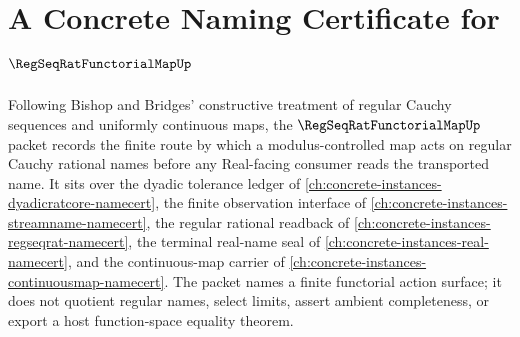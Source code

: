 \chapter{A Concrete Naming Certificate for $\RegSeqRatFunctorialMapUp$}
\label{ch:concrete-instances-regseqrat-functorial-map-namecert}

Following Bishop and Bridges' constructive treatment of regular Cauchy sequences and uniformly continuous maps, the $\RegSeqRatFunctorialMapUp$ packet records the finite route by which a modulus-controlled map acts on regular Cauchy rational names before any Real-facing consumer reads the transported name. It sits over the dyadic tolerance ledger of \autoref{ch:concrete-instances-dyadicratcore-namecert}, the finite observation interface of \autoref{ch:concrete-instances-streamname-namecert}, the regular rational readback of \autoref{ch:concrete-instances-regseqrat-namecert}, the terminal real-name seal of \autoref{ch:concrete-instances-real-namecert}, and the continuous-map carrier of \autoref{ch:concrete-instances-continuousmap-namecert}. The packet names a finite functorial action surface; it does not quotient regular names, select limits, assert ambient completeness, or export a host function-space equality theorem.

